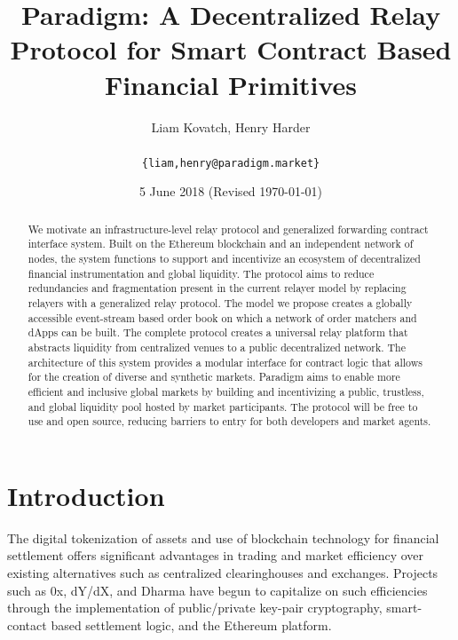 \documentclass[9pt]{article}
\begin{document}
\title{ \textbf{Paradigm: A Decentralized Relay Protocol for Smart Contract Based Financial Primitives} } 
\author{Liam Kovatch, Henry Harder \\ \\ \texttt{\{liam,henry@paradigm.market\}}} 
\date{5 June 2018 (Revised \today)}
\maketitle 


\begin{abstract}

\noindent We motivate an infrastructure-level relay protocol and generalized forwarding contract interface system. Built on the Ethereum blockchain and an independent network of nodes, the system functions to support and incentivize an ecosystem of decentralized financial instrumentation and global liquidity. The protocol aims to reduce redundancies and fragmentation present in the current relayer model by replacing relayers with a generalized relay protocol. The model we propose creates a globally accessible event-stream based order book on which a network of order matchers and dApps can be built. The complete protocol creates a universal relay platform that abstracts liquidity from centralized venues to a public decentralized network. The architecture of this system provides a modular interface for contract logic that allows for the creation of diverse and synthetic markets. Paradigm aims to enable more efficient and inclusive global markets by building and incentivizing a public, trustless, and global liquidity pool hosted by market participants. The protocol will be free to use and open source, reducing barriers to entry for both developers and market agents. \\

\end{abstract}
\pagebreak


\tableofcontents
\pagebreak


\section{Introduction}\label{intro}

\noindent The digital tokenization of assets and use of blockchain technology for financial settlement offers significant advantages in trading and market efficiency over existing alternatives such as centralized clearinghouses and exchanges\cite{defi}. Projects such as 0x\cite{0xwhitepaper}, dY/dX\cite{dydxwhitepaper}, and Dharma\cite{dharmawhitepaper} have begun to capitalize on such efficiencies through the implementation of public/private key-pair cryptography, smart-contact based settlement logic, and the Ethereum platform. \\
\end{document}

